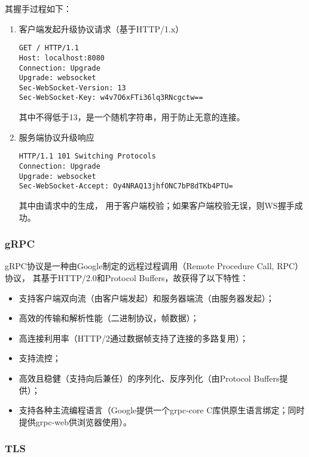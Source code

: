 其握手过程如下：

\begin{enumerate}
    \item 客户端发起升级协议请求（基于HTTP/1.x）\\
        \begin{lstlisting}
GET / HTTP/1.1 
Host: localhost:8080 
Connection: Upgrade 
Upgrade: websocket 
Sec-WebSocket-Version: 13 
Sec-WebSocket-Key: w4v7O6xFTi36lq3RNcgctw==
        \end{lstlisting}
        其中不得低于13，是一个随机字符串，用于防止无意的连接。
    \item 服务端协议升级响应 \\
        \begin{lstlisting}
HTTP/1.1 101 Switching Protocols
Connection: Upgrade
Upgrade: websocket
Sec-WebSocket-Accept: Oy4NRAQ13jhfONC7bP8dTKb4PTU=
        \end{lstlisting}
        其中由请求中的生成，
        用于客户端校验；如果客户端校验无误，则WS握手成功。
\end{enumerate}

\subsubsection{gRPC}

gRPC协议\cite{grpc}是一种由Google制定的远程过程调用（Remote Procedure Call, RPC）协议，
其基于HTTP/2.0和Protocol Buffers\cite{protocol-buffers}，故获得了以下特性：

\begin{itemize}
    \item 支持客户端双向流（由客户端发起）和服务器端流（由服务器发起）；
    \item 高效的传输和解析性能（二进制协议，帧数据）；
    \item 高连接利用率（HTTP/2通过数据帧支持了连接的多路复用）；
    \item 支持流控；
    \item 高效且稳健（支持向后兼任）的序列化、反序列化（由Protocol Buffers提供）；
    \item 支持各种主流编程语言（Google提供一个grpc-core C库供原生语言绑定；同时提供grpc-web供浏览器使用）。
\end{itemize}

\subsubsection{TLS}

